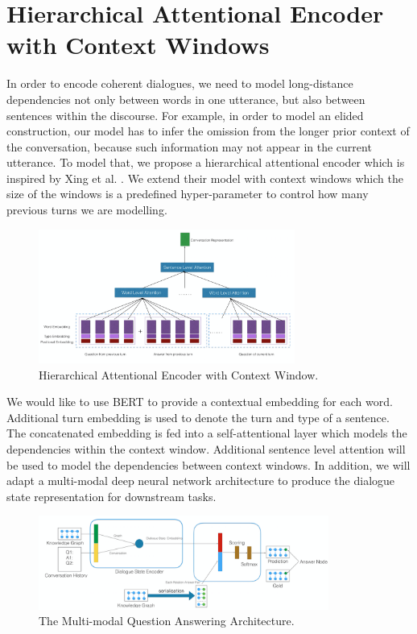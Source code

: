 \documentclass[bsc,frontabs,twoside,singlespacing,parskip,deptreport]{infthesis}     %
\begin{document}
\section{Hierarchical Attentional Encoder with Context Windows}

In order to encode coherent dialogues, we need to model long-distance dependencies not only between words in one utterance, but also between sentences within the discourse. For example, in order to model an elided construction, our model has to infer the omission from the longer prior context of the conversation, because such information may not appear in the current utterance. To model that, we propose a hierarchical attentional encoder which is inspired by Xing et al. \cite{xing2018hierarchical}. We extend their model with context windows which the size of the windows is a predefined hyper-parameter to control how many previous turns we are modelling. 


\begin{figure}[h]
    \centering
    \includegraphics[width=0.75\textwidth]{attemodel.png}
    \caption{Hierarchical Attentional Encoder with Context Window.}
    \label{fig:mesh1}
\end{figure}

We would like to use BERT\cite{devlin2018bert} to provide a contextual embedding for each word. Additional turn embedding is used to denote the turn and type of a sentence. The concatenated embedding is fed into a self-attentional layer which models the dependencies within the context window. Additional sentence level attention will be used to model the dependencies between context windows. In addition, we will adapt a multi-modal deep neural network architecture to produce the dialogue state representation for downstream tasks.

\begin{figure}[h]
    \centering
    \includegraphics[width=0.85\textwidth]{qa1pro.png}
    \caption{The Multi-modal Question Answering Architecture.}
    \label{fig:mesh1}
\end{figure}
\end{document}
